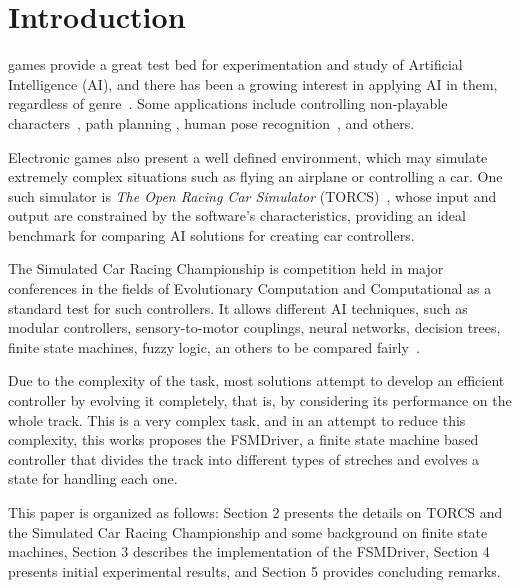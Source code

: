 \section{Introduction}
 games provide a great test bed for experimentation and 
study of Artificial Intelligence (AI), and there has been a growing interest in 
applying AI in them, regardless of genre~\cite{simon2008}. Some applications 
include controlling non-playable characters~\cite{stanley2005}, path planning 
\cite{freitas2012}, human pose recognition~\cite{shotton2011}, and others. 

Electronic games also present a well defined environment, which may simulate 
extremely complex situations such as flying an airplane or controlling a car. One such simulator is \emph{The Open Racing Car Simulator} (TORCS)~\cite{TORCS}, whose input and output are constrained by the software's characteristics, providing an ideal benchmark for comparing AI solutions for creating car controllers.

The Simulated Car Racing Championship is competition held in major conferences 
in the fields of Evolutionary Computation and Computational as a standard test
for such controllers. It allows different AI techniques, such as modular
controllers, sensory-to-motor couplings, neural networks, decision trees, finite
state machines, fuzzy logic, an others to be compared fairly~\cite{scr2009}. 

Due to  the complexity of the task, most solutions attempt to develop an efficient
controller by evolving it completely, that is, by considering its performance on
the whole track. This is a very complex task, and in an attempt to
reduce this complexity, this works proposes the FSMDriver, a finite state machine based controller that divides the track into different types of streches and evolves a state for handling each one.

This paper is organized as follows: Section 2 presents the details on TORCS and 
the Simulated Car Racing Championship and some background on finite state machines,
Section 3 describes the implementation of the FSMDriver, Section 4 presents 
initial experimental results, and Section 5 provides concluding remarks.
